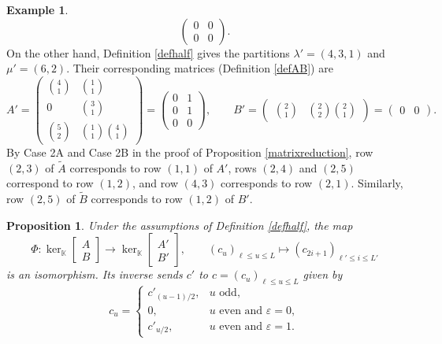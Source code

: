 \documentclass[11pt]{amsart}
\newtheorem{proposition}[theorem]{Proposition}
\theoremstyle{remark}
\theoremstyle{definition}
\newtheorem{example}[theorem]{Example}
\newcommand{\la}{\lambda}
\newcommand{\K}{\mathbb K}
\numberwithin{equation}{section}
\begin{document}
\begin{example}
\[\begin{pmatrix}
		0&0\\
		0&0
	\end{pmatrix}.
	\]
	On the other hand, Definition \ref{defhalf} gives the partitions $\la'=(4,3,1)$ and $\mu'=(6,2)$. Their corresponding matrices (Definition \ref{defAB}) are
	\[
	A'=\begin{pmatrix}
		\binom{4}{1}&\binom{1}{1}\\[3pt]
		0&\binom{3}{1}\\[3pt]
		\binom{5}{2}&\binom{1}{1}\binom{4}{1}
	\end{pmatrix}
	=\begin{pmatrix}
		0&1\\
		0&1\\
		0&0
	\end{pmatrix},
	\qquad
	B'=\begin{pmatrix}
		\binom{2}{1}&\binom{2}{2}\binom{2}{1}
	\end{pmatrix}
	=\begin{pmatrix}0&0\end{pmatrix}.
	\]
By Case 2A and Case 2B in the proof of Proposition \ref{matrixreduction},
row $(2,3)$ of $\widetilde A$ corresponds to row $(1,1)$ of $A'$,
rows $(2,4)$ and $(2,5)$ correspond to row $(1,2)$, and
row $(4,3)$ corresponds to row $(2,1)$.
Similarly, row $(2,5)$ of $\widetilde B$ corresponds to
row $(1,2)$ of $B'$.
\end{example}

	\begin{proposition}\label{propiso}
		Under the assumptions of Definition \ref{defhalf}, the map
		\[
		\Phi:\ker_\K\left[\begin{smallmatrix}A\\B\end{smallmatrix}\right]
		\longrightarrow\ker_\K\left[\begin{smallmatrix}A'\\B'\end{smallmatrix}\right],
		\qquad
		(c_u)_{\ell\le u\le L}\mapsto
		(c_{2i+1})_{\ell'\le i\le L'}
		\]
		is an isomorphism. Its inverse sends $c'$ to $c=(c_u)_{\ell\le u\le L}$ given by
		\begin{equation}\label{inv}
			c_u=
			\begin{cases}
				c'_{(u-1)/2},&u\text{ odd},\\
				0,&u\text{ even and }\varepsilon=0,\\
				c'_{u/2},&u\text{ even and }\varepsilon=1.
			\end{cases}
		\end{equation}
	\end{proposition}
\end{document}

